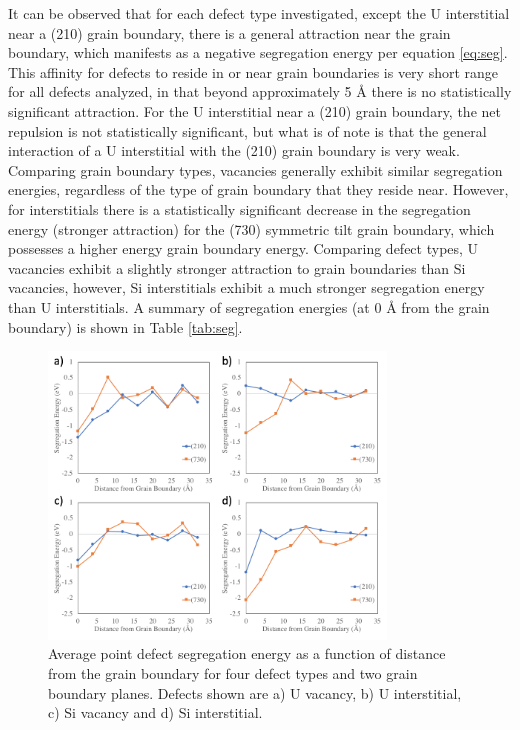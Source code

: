 \documentclass[review]{elsarticle}
\begin{document}
It can be observed that for each defect type investigated, except the U interstitial near a (210) grain boundary, there is a general attraction near the grain boundary, which manifests as a negative segregation energy per equation \ref{eq:seg}. This affinity for defects to reside in or near grain boundaries is very short range for all defects analyzed, in that beyond approximately 5 {\AA} there is no statistically significant attraction. For the U interstitial near a (210) grain boundary, the net repulsion is not statistically significant, but what is of note is that the general interaction of a U interstitial with the (210) grain boundary is very weak. Comparing grain boundary types, vacancies generally exhibit similar segregation energies, regardless of the type of grain boundary that they reside near. However, for interstitials there is a statistically significant decrease in the segregation energy (stronger attraction) for the (730) symmetric tilt grain boundary, which possesses a higher energy grain boundary energy. Comparing defect types, U vacancies exhibit a slightly stronger attraction to grain boundaries than Si vacancies, however, Si interstitials exhibit a much stronger segregation energy than U interstitials. A summary of segregation energies (at 0 {\AA} from the grain boundary) is shown in Table \ref{tab:seg}. 
 
\begin{figure}[h]
 \centering
 \includegraphics[width=0.8\textwidth]{gbdefs_seg.png} 
 \caption{Average point defect segregation energy as a function of distance from the grain boundary for four defect types and two grain boundary planes. Defects shown are a) U vacancy, b) U interstitial, c) Si vacancy and d) Si interstitial. }
 \label{fig:seg}
\end{figure}
\end{document}
